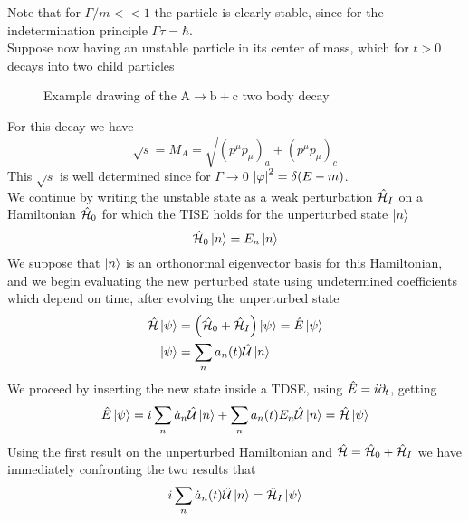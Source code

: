 \documentclass[../qm.tex]{subfiles}
\begin{document}
Note that for $\Gamma/m<<1$ the particle is clearly stable, since for the indetermination principle $\Gamma\tau=\hbar$.\\
Suppose now having an unstable particle in its center of mass, which for $t>0$ decays into two child particles
\begin{figure}[H]
	\centering
	\caption{Example drawing of the $\mathrm{A}\to\mathrm{b+c}$ two body decay}
	\label{fig:weaktwobody}
\end{figure}
For this decay we have
\begin{equation*}
	\sqrt{s}=M_A=\sqrt{(p^\mu p_\mu)_a+(p^\mu p_\mu)_c}
\end{equation*}
This $\sqrt{s}$ is well determined since for $\Gamma\to0$ $\abs{\varphi}^2=\delta(E-m)$.\\
We continue by writing the unstable state as a weak perturbation $\hat{\mathcal{H}}_I$ on a Hamiltonian $\hat{\mathcal{H}}_0$ for which the TISE holds for the unperturbed state $\ket{n}$
\begin{equation*}
	\hat{\mathcal{H}}_0\ket{n}=E_n\ket{n}
\end{equation*}
We suppose that $\ket{n}$ is an orthonormal eigenvector basis for this Hamiltonian, and we begin evaluating the new perturbed state using undetermined coefficients which depend on time, after evolving the unperturbed state
\begin{equation*}
	\begin{aligned}
		\hat{\mathcal{H}}\ket{\psi}&=\left( \hat{\mathcal{H}}_0+\hat{\mathcal{H}}_I \right)\ket{\psi}=\hat{E}\ket{\psi}\\
		\ket{\psi}&=\sum_na_n(t)\hat{\mathcal{U}}\ket{n}
	\end{aligned}
\end{equation*}
We proceed by inserting the new state inside a TDSE, using $\hat{E}=i\partial_t$, getting
\begin{equation*}
	\hat{E}\ket{\psi}=i\sum_n\dot{a}_n\hat{\mathcal{U}}\ket{n}+\sum_na_n(t)E_n\hat{\mathcal{U}}\ket{n}=\hat{\mathcal{H}}\ket{\psi}
\end{equation*}
Using the first result on the unperturbed Hamiltonian and $\hat{\mathcal{H}}=\hat{\mathcal{H}}_0+\hat{\mathcal{H}}_I$ we have immediately confronting the two results that
\begin{equation*}
	i\sum_n\dot{a}_n(t)\hat{\mathcal{U}}\ket{n}=\hat{\mathcal{H}}_I\ket{\psi}
\end{equation*}
\end{document}
